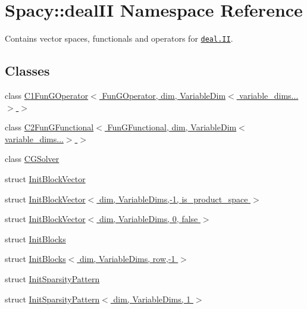 \hypertarget{namespaceSpacy_1_1dealII}{\section{\-Spacy\-:\-:deal\-I\-I \-Namespace \-Reference}
\label{namespaceSpacy_1_1dealII}
}


\-Contains vector spaces, functionals and operators for \href{www.deal.org}{\tt deal.\-I\-I}.  


\subsection*{\-Classes}
\begin{DoxyCompactItemize}
\item 
class \hyperlink{classSpacy_1_1dealII_1_1C1FunGOperator_3_01FunGOperator_00_01dim_00_01VariableDim_3_01variable__dims_8_8_8_4_01_4}{\-C1\-Fun\-G\-Operator$<$ Fun\-G\-Operator, dim, Variable\-Dim$<$ variable\-\_\-dims...$>$ $>$}
\item 
class \hyperlink{classSpacy_1_1dealII_1_1C2FunGFunctional_3_01FunGFunctional_00_01dim_00_01VariableDim_3_01variable__dims_8_8_8_4_01_4}{\-C2\-Fun\-G\-Functional$<$ Fun\-G\-Functional, dim, Variable\-Dim$<$ variable\-\_\-dims...$>$ $>$}
\item 
class \hyperlink{classSpacy_1_1dealII_1_1CGSolver}{\-C\-G\-Solver}
\item 
struct \hyperlink{structSpacy_1_1dealII_1_1InitBlockVector}{\-Init\-Block\-Vector}
\item 
struct \hyperlink{structSpacy_1_1dealII_1_1InitBlockVector_3_01dim_00_01VariableDims_00-1_00_01is__product__space_01_4}{\-Init\-Block\-Vector$<$ dim, Variable\-Dims,-\/1, is\-\_\-product\-\_\-space $>$}
\item 
struct \hyperlink{structSpacy_1_1dealII_1_1InitBlockVector_3_01dim_00_01VariableDims_00_010_00_01false_01_4}{\-Init\-Block\-Vector$<$ dim, Variable\-Dims, 0, false $>$}
\item 
struct \hyperlink{structSpacy_1_1dealII_1_1InitBlocks}{\-Init\-Blocks}
\item 
struct \hyperlink{structSpacy_1_1dealII_1_1InitBlocks_3_01dim_00_01VariableDims_00_01row_00-1_01_4}{\-Init\-Blocks$<$ dim, Variable\-Dims, row,-\/1 $>$}
\item 
struct \hyperlink{structSpacy_1_1dealII_1_1InitSparsityPattern}{\-Init\-Sparsity\-Pattern}
\item 
struct \hyperlink{structSpacy_1_1dealII_1_1InitSparsityPattern_3_01dim_00_01VariableDims_00_011_01_4}{\-Init\-Sparsity\-Pattern$<$ dim, Variable\-Dims, 1 $>$}

\end{DoxyCompactItemize}
